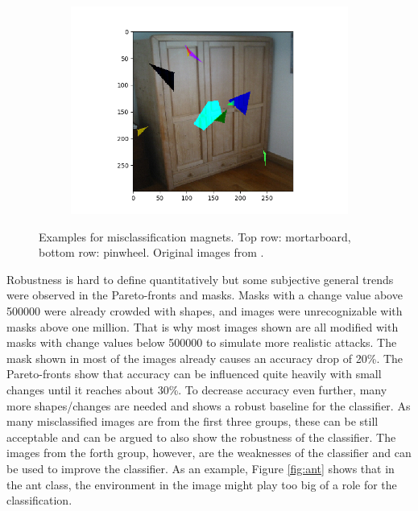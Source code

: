 \documentclass[conference]{IEEEtran}
\begin{document}
\begin{figure}[htbp]
\begin{subfigure}[t]{.3\textwidth}
\end{subfigure}
\begin{subfigure}[t]{.3\textwidth}
  \includegraphics[width=1\linewidth]{fig/wardrobe-pinwheel.png}
\end{subfigure}
\caption{Examples for misclassification magnets. Top row: mortarboard, bottom row: pinwheel. Original images from \cite{imagenet}.}
\label{fig:magnets}
\end{figure}

Robustness is hard to define quantitatively but some subjective general trends were observed in the Pareto-fronts and masks.
Masks with a change value above 500000 were already crowded with shapes, and images were unrecognizable with masks above one million.
That is why most images shown are all modified with masks with change values below 500000 to simulate more realistic attacks.
The mask shown in most of the images already causes an accuracy drop of 20\%.
The Pareto-fronts show that accuracy can be influenced quite heavily with small changes until it reaches about 30\%.
To decrease accuracy even further, many more shapes/changes are needed and shows a robust baseline for the classifier.
As many misclassified images are from the first three groups, these can be still acceptable and can be argued to also show the robustness of the classifier.
The images from the forth group, however, are the weaknesses of the classifier and can be used to improve the classifier.
As an example, Figure \ref{fig:ant} shows that in the ant class, the environment in the image might play too big of a role for the classification.
\end{document}
